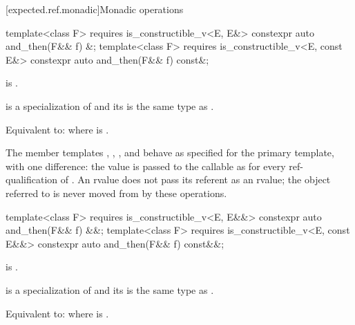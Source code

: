 [expected.ref.monadic]{Monadic operations}

%
\begin{itemdecl}
template<class F>
  requires is_constructible_v<E, E&>
constexpr auto and_then(F&& f) &;
template<class F>
  requires is_constructible_v<E, const E&>
constexpr auto and_then(F&& f) const&;
\end{itemdecl}

\begin{itemdescr}
\pnum
\constraints
{} is .

\pnum
\mandates
{} is a specialization of  and its  is the same type as .

\pnum
\effects
Equivalent to:  where  is .

\pnum
\remarks
The member templates , , , and  behave as specified for the primary template, with one difference: the value is passed to the callable as  for every ref-qualification of . An rvalue  does not pass its referent as an rvalue; the object referred to is never moved from by these operations.
\end{itemdescr}

%
\begin{itemdecl}
template<class F>
  requires is_constructible_v<E, E&&>
constexpr auto and_then(F&& f) &&;
template<class F>
  requires is_constructible_v<E, const E&&>
constexpr auto and_then(F&& f) const&&;
\end{itemdecl}

\begin{itemdescr}
\pnum
\constraints
{} is .

\pnum
\mandates
{} is a specialization of  and its  is the same type as .

\pnum
\effects
Equivalent to:  where  is .
\end{itemdescr}

